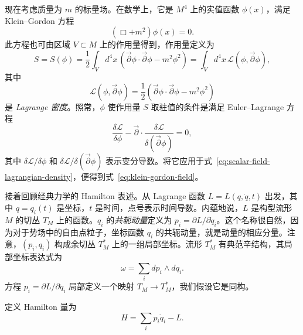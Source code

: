 现在考虑质量为 $m$ 的标量场。在数学上，它是 $M^4$ 上的实值函数 $\phi(x)$，满足 Klein--Gordon 方程
\begin{equation}\label{eq:klein-gordon-field}
(\Box+m^2)\phi(x)=0.
\end{equation}
此方程也可由区域 $V\subset M$ 上的作用量得到，作用量定义为
\begin{equation}\label{eq:scalar-field-action}
S=S(\phi)=\frac12\int_Vd^4x\,
(\vec\partial\phi\cdot\vec\partial\phi-m^2\phi^2)
=\int_Vd^4x\,\mathcal L(\phi,\vec\partial\phi),
\end{equation}
其中
\begin{equation}\label{eq:scalar-field-lagrangian-density}
\mathcal L(\phi,\vec\partial\phi)
=\frac12(\vec\partial\phi\cdot\vec\partial\phi-m^2\phi^2)
\end{equation}
是 \emph{Lagrange 密度}。照常，$\phi$ 使作用量 $S$ 取驻值的条件是满足 Euler--Lagrange 方程
\begin{equation}\label{eq:field-euler-lagrange}
\frac{\delta\mathcal L}{\delta\phi}
-\vec\partial\cdot\frac{\delta\mathcal L}{\delta(\vec\partial\phi)}=0,
\end{equation}
其中 $\delta\mathcal L/\delta\phi$ 和 $\delta\mathcal L/\delta(\vec\partial\phi)$ 表示变分导数。将它应用于式~\eqref{eq:scalar-field-lagrangian-density}，便得到式~\eqref{eq:klein-gordon-field}。

接着回顾经典力学的 Hamilton 表述。从 Lagrange 函数 $L=L(q,\dot q,t)$ 出发，其中 $q=q_i(t)$ 是坐标，$t$ 是时间，点号表示时间导数。内蕴地说，$L$ 是构型流形 $M$ 的切丛 $T_M$ 上的函数。$q_i$ 的\emph{共轭动量}定义为 $p_i=\partial L/\partial\dot q_i$。这个名称很自然，因为对于势场中的自由点粒子，坐标函数 $q_i$ 的共轭动量，就是动量的相应分量。注意，$(p_i,q_i)$ 构成余切丛 $T_M^*$ 上的一组局部坐标。流形 $T_M^*$ 有典范辛结构，其局部坐标表达式为
\[
\omega=\sum_i dp_i\wedge dq_i.
\]
方程 $p_i=\partial L/\partial\dot q_i$ 局部定义一个映射 $T_M\to T_M^*$，我们假设它是同构。

定义 Hamilton 量为
\[
H=\sum_i p_i\dot q_i-L.
\]

